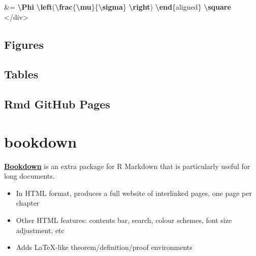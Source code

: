 \documentclass[
]{book}
\newenvironment{Shaded}{\begin{snugshade}}{\end{snugshade}}
\newcommand{\ExtensionTok}[1]{#1}
\newcommand{\KeywordTok}[1]{\textcolor[rgb]{0.13,0.29,0.53}{\textbf{#1}}}
\newcommand{\NormalTok}[1]{#1}
\newcommand{\SpecialCharTok}[1]{\textcolor[rgb]{0.81,0.36,0.00}{\textbf{#1}}}
\newcommand{\SpecialStringTok}[1]{\textcolor[rgb]{0.31,0.60,0.02}{#1}}
\providecommand{\tightlist}{%
  \setlength{\itemsep}{0pt}\setlength{\parskip}{0pt}}
\theoremstyle{definition}
\theoremstyle{definition}
\theoremstyle{definition}
\theoremstyle{definition}
\theoremstyle{remark}
\begin{document}
\begin{Shaded}
\begin{Highlighting}[]
\SpecialStringTok{\&= }\SpecialCharTok{\textbackslash{}Phi}\SpecialStringTok{ }\SpecialCharTok{\textbackslash{}left}\SpecialStringTok{(}\SpecialCharTok{\textbackslash{}frac}\SpecialStringTok{\{}\SpecialCharTok{\textbackslash{}mu}\SpecialStringTok{\}\{}\SpecialCharTok{\textbackslash{}sigma}\SpecialStringTok{\} }\SpecialCharTok{\textbackslash{}right}\SpecialStringTok{) }
\KeywordTok{\textbackslash{}end}\NormalTok{\{}\ExtensionTok{aligned}\NormalTok{\}}\SpecialStringTok{  }\SpecialCharTok{\textbackslash{}square}
\SpecialStringTok{$$}
\NormalTok{\textasciigrave{}\textasciigrave{}\textasciigrave{}}
\NormalTok{\textless{}/div\textgreater{}}
\end{Highlighting}
\end{Shaded}

\section{Figures}\label{figures}

\section{Tables}\label{tables}

\section{Rmd GitHub Pages}\label{rmd-github-pages}

\chapter{bookdown}\label{bookdown}

\textbf{\href{https://bookdown.org/yihui/rmarkdown/bookdown-start.html}{Bookdown}} is an extra package for R Markdown that is particularly useful for long documents.

\begin{itemize}
\tightlist
\item
  In HTML format, produces a full website of interlinked pages, one page per chapter
\item
  Other HTML features: contents bar, search, colour schemes, font size adjustment, etc
\item
  Adds LaTeX-like theorem/definition/proof environments
\end{itemize}
\end{document}
